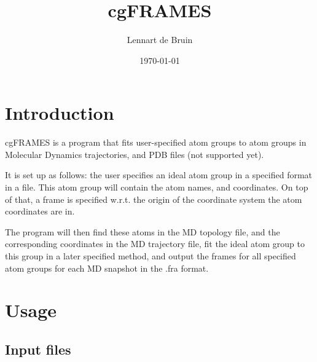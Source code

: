 \documentclass[a4paper,11pt]{scrartcl}
\title{cgFRAMES}
\author{Lennart de Bruin}
\date{\today}
\begin{document}
\maketitle

\tableofcontents

\section{Introduction}

cgFRAMES is a program that fits user-specified atom groups to atom groups in Molecular Dynamics trajectories, and PDB files (not supported yet).

It is set up as follows: the user specifies an ideal atom group in a specified format in a file. This atom group will contain the atom names, and coordinates. On top of that, a frame is specified w.r.t. the origin of the coordinate system the atom coordinates are in.

The program will then find these atoms in the MD topology file, and the corresponding coordinates in the MD trajectory file, fit the ideal atom group to this group in a later specified method, and output the frames for all specified atom groups for each MD snapshot in the .fra format.

\section{Usage}

\subsection{Input files}

\end{document}
